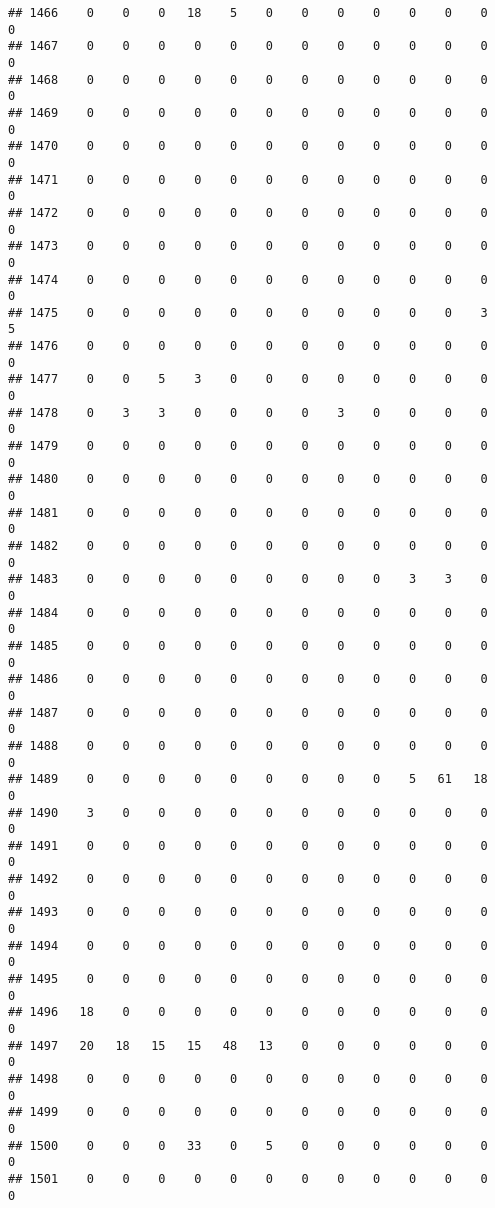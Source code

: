 \documentclass[]{article}
\begin{document}
\begin{verbatim}
## 1466    0    0    0   18    5    0    0    0    0    0    0    0    0
## 1467    0    0    0    0    0    0    0    0    0    0    0    0    0
## 1468    0    0    0    0    0    0    0    0    0    0    0    0    0
## 1469    0    0    0    0    0    0    0    0    0    0    0    0    0
## 1470    0    0    0    0    0    0    0    0    0    0    0    0    0
## 1471    0    0    0    0    0    0    0    0    0    0    0    0    0
## 1472    0    0    0    0    0    0    0    0    0    0    0    0    0
## 1473    0    0    0    0    0    0    0    0    0    0    0    0    0
## 1474    0    0    0    0    0    0    0    0    0    0    0    0    0
## 1475    0    0    0    0    0    0    0    0    0    0    0    3    5
## 1476    0    0    0    0    0    0    0    0    0    0    0    0    0
## 1477    0    0    5    3    0    0    0    0    0    0    0    0    0
## 1478    0    3    3    0    0    0    0    3    0    0    0    0    0
## 1479    0    0    0    0    0    0    0    0    0    0    0    0    0
## 1480    0    0    0    0    0    0    0    0    0    0    0    0    0
## 1481    0    0    0    0    0    0    0    0    0    0    0    0    0
## 1482    0    0    0    0    0    0    0    0    0    0    0    0    0
## 1483    0    0    0    0    0    0    0    0    0    3    3    0    0
## 1484    0    0    0    0    0    0    0    0    0    0    0    0    0
## 1485    0    0    0    0    0    0    0    0    0    0    0    0    0
## 1486    0    0    0    0    0    0    0    0    0    0    0    0    0
## 1487    0    0    0    0    0    0    0    0    0    0    0    0    0
## 1488    0    0    0    0    0    0    0    0    0    0    0    0    0
## 1489    0    0    0    0    0    0    0    0    0    5   61   18    0
## 1490    3    0    0    0    0    0    0    0    0    0    0    0    0
## 1491    0    0    0    0    0    0    0    0    0    0    0    0    0
## 1492    0    0    0    0    0    0    0    0    0    0    0    0    0
## 1493    0    0    0    0    0    0    0    0    0    0    0    0    0
## 1494    0    0    0    0    0    0    0    0    0    0    0    0    0
## 1495    0    0    0    0    0    0    0    0    0    0    0    0    0
## 1496   18    0    0    0    0    0    0    0    0    0    0    0    0
## 1497   20   18   15   15   48   13    0    0    0    0    0    0    0
## 1498    0    0    0    0    0    0    0    0    0    0    0    0    0
## 1499    0    0    0    0    0    0    0    0    0    0    0    0    0
## 1500    0    0    0   33    0    5    0    0    0    0    0    0    0
## 1501    0    0    0    0    0    0    0    0    0    0    0    0    0

\end{verbatim}
\end{document}
